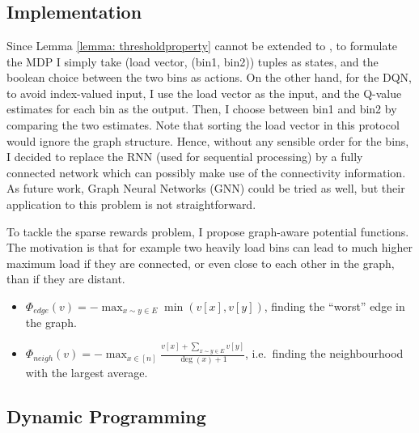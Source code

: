 \section{\GraphicalTwoChoice}


\subsection{\DQL Implementation} \label{graphical-DQN}

Since Lemma \ref{lemma: thresholdproperty} cannot be extended to \GraphicalTwoChoice, to formulate the MDP I simply take (load vector, (bin1, bin2)) tuples as states, and the boolean choice between the two bins as actions. On the other hand, for the DQN, to avoid index-valued input, I use the load vector as the input, and the Q-value estimates for each bin as the output. Then, I choose between bin1 and bin2 by comparing the two estimates. Note that sorting the load vector in this protocol would ignore the graph structure. Hence, without any sensible order for the bins, I decided to replace the RNN (used for sequential processing) by a fully connected network which can possibly make use of the connectivity information. As future work, Graph Neural Networks (GNN) \cite{scarselli2009GNN} could be tried as well, but their application to this problem is not straightforward.



To tackle the sparse rewards problem, I propose graph-aware potential functions. The motivation is that for example two heavily load bins can lead to much higher maximum load if they are connected, or even close to each other in the graph, than if they are distant.


\begin{itemize}
    \item 
    $\Phi_{edge}(v)=-\max_{x\sim y \in E} \min(v[x], v[y])$, finding the ``worst'' edge in the graph.
    \item
    $\Phi_{neigh}(v)=-\max_{x \in [n]} \frac{v[x]+\sum_{x\sim y \in E}v[y]}{\deg(x)+1}$, i.e.\ finding the neighbourhood with the largest average.
\end{itemize}


\subsection{Dynamic Programming}

